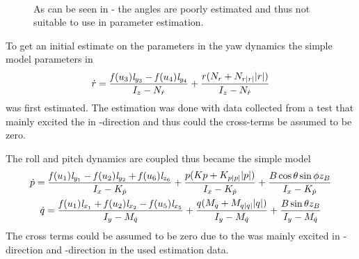 \begin{figure}[tbp]
  \centering
  \qquad
  \\
  \caption{\label{fig:integratedAngleVelocities}%
    As can be seen in \protect{}-\protect{} the angles are poorly estimated and thus not suitable to use in parameter estimation.}
\end{figure}

To get an initial estimate on the parameters in the yaw dynamics the simple model parameters in
\begin{equation} \label{eq:r_dot_simple}
\dot{r} = \frac{\mathit{f}(u_{3}) \mathit{l}_{y_{3}} - \mathit{f}(u_{4}) \mathit{l}_{y_{4}}}{I_{z} - N_{\dot{r}}} + \frac{r (N_{r} + N_{r|r|} |r|)}{I_{z} - N_{\dot{r}}}
\end{equation}
was first estimated. The estimation was done with data collected from a test that mainly excited the \abbrROV in \yawAngle-direction and thus could the cross-terms be assumed to be zero.

The roll and pitch dynamics are coupled thus became the simple model 
\begin{multline} \label{eq:pq_dot_simple}
\dot{p} = \frac{\mathit{f}(u_{1}) \mathit{l}_{y_{1}} - \mathit{f}(u_{2}) \mathit{l}_{y_{2}} + \mathit{f}(u_{6}) \mathit{l}_{z_{6}}}{I_{x} - K_{\dot{p}}} + \frac{p (Kp + K_{p|p|} |p|)}{I_{x} - K_{\dot{p}}} + \frac{B \cos{\theta} \sin{\phi} z_B}{I_{x} - K_{\dot{p}}} \\
\dot{q} =\frac{\mathit{f}(u_{1}) \mathit{l}_{x_{1}} + \mathit{f}(u_{2}) \mathit{l}_{x_{2}} - \mathit{f}(u_{5}) \mathit{l}_{x_{5}}}{I_{y} - M_{\dot{q}}} + \frac{q (M_{q} + M_{q|q|} |q|)}{I_{y} - M_{\dot{q}}} + \frac{B \sin{\theta} z_B}{I_{y} - M_{\dot{q}}} 
\end{multline}
The cross terms could be assumed to be zero due to the \abbrROV was mainly excited in \rollAngle-direction and \pitchAngle-direction in the used estimation data.

